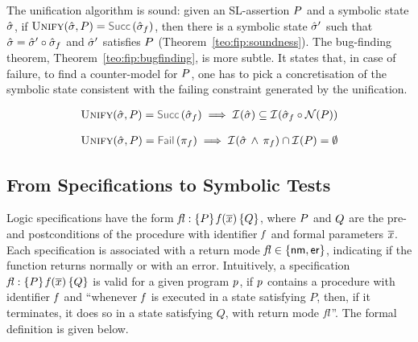 The unification algorithm is sound: 
given an SL-assertion $P$ and a symbolic state $\hat{\sigma}$, if
$\unificationfun(\sstate, \pass) = \success{\sstate_f}$, then there is a symbolic state
$\hat{\sigma}'$ such that $\hat{\sigma} = \hat{\sigma}' \circ \hat{\sigma}_f$ and $\hat{\sigma}'$ satisfies $P$ (Theorem~\ref{teo:fip:soundness}). 
The bug-finding theorem, Theorem~\ref{teo:fip:bugfinding}, is more subtle. It states that, 
in case of failure, to find a counter-model for $P$, one has to pick a concretisation of the 
symbolic state consistent with the failing constraint generated by the unification.%


\begin{theorem}\label{teo:fip:soundness}
$$
\begin{array}{l}
	\unificationfun(\sstate, \pass) = \success{\sstate_f}
        \implies 
        \interpret{}{}(\sstate) \subseteq \interpret{}{}(\sstate_f \statecompose \normaliser(\pass))
\end{array}
$$ 
\end{theorem}

\begin{theorem}\label{teo:fip:bugfinding}
$$
\begin{array}{l}
\unificationfun(\sstate, \pass) = \fail{\pc_f} 
   \implies
   \interpret{}{}(\sstate \, \wedge \, \pc_f) \cap \interpret{}{}(\pass) = \emptyset
\end{array}
$$ 
\end{theorem}



\subsection{From Specifications to Symbolic Tests}\label{specs:to:symbolic:tests}

\jsil Logic specifications have the form ${\mathit{fl}} : \{ P \} \, \mathit{f}(\overline{x}) \, \{ Q \}$, where $P$ and $Q$ are the 
pre- and postconditions of the procedure with identifier $\mathit{f}$ and formal parameters $\overline{x}$. 
Each specification is associated with a return mode $\mathit{fl} \in \{ {\sf nm}, {\sf er} \}$, indicating if the function
 returns normally or with an error. 
 Intuitively, a specification ${\mathit{fl}} : \{ P \} \, \mathit{f}(\overline{x}) \, \{ Q \}$ is 
valid for a given \jsil program $p$, if $p$ contains a procedure with identifier 
$\mathit{f}$ and ``whenever $\mathit{f}$ is executed in a state satisfying $P$, then, 
if it terminates, it does so in a state satisfying $Q$, with return mode $\mathit{fl}$''.
The formal definition is given below. 


